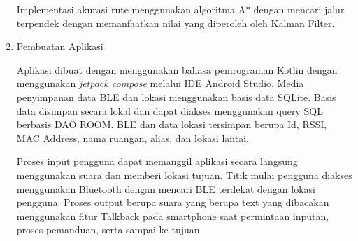\begin{enumerate}
\par Implementasi akurasi rute menggunakan algoritma A* dengan mencari jalur terpendek dengan memanfaatkan nilai yang diperoleh oleh Kalman Filter.

	\item Pembuatan Aplikasi
	\par Aplikasi dibuat dengan menggunakan bahasa pemrograman Kotlin dengan menggunakan \textit{jetpack compose} melalui IDE Android Studio. Media penyimpanan data BLE dan lokasi menggunakan basis data SQLite. Basis data disimpan secara lokal dan dapat diakses menggunakan query SQL berbasis DAO ROOM. BLE dan data lokasi tersimpan berupa Id, RSSI, MAC Address, nama ruangan, alias, dan lokasi lantai. 
	
	\par Proses input pengguna dapat memanggil aplikasi secara langsung menggunakan suara dan memberi lokasi tujuan. Titik mulai pengguna diakses menggunakan Bluetooth dengan mencari BLE terdekat dengan lokasi pengguna. Proses output berupa suara yang berupa text yang dibacakan menggunakan fitur Talkback pada smartphone saat permintaan inputan, proses pemanduan, serta sampai ke tujuan.
	

\end{enumerate}
